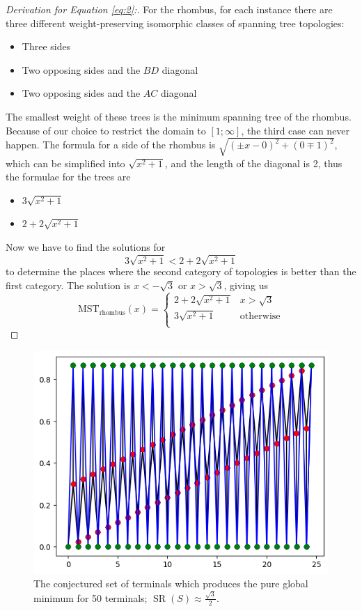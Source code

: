 \documentclass{mpaper}
\begin{document}
\begin{proof} [Derivation for Equation \ref{eq:2}:]
  For the rhombus, for each instance there are three different weight-preserving isomorphic classes of spanning tree topologies:
  \begin{itemize}
    \item Three sides
    \item Two opposing sides and the $BD$ diagonal
    \item Two opposing sides and the $AC$ diagonal
  \end{itemize}
  The smallest weight of these trees is the minimum spanning tree of the rhombus. Because of our choice to restrict the domain to $[1;\infty]$, the third case can never happen. The formula for a side of the rhombus is $\sqrt{(\pm x-0)^2+(0\mp 1)^2}$, which can be simplified into $\sqrt{x^2+1}$, and the length of the diagonal is 2, thus the formulae for the trees are
  \begin{itemize}
    \item $3\sqrt{x^2+1}$
    \item $2+2\sqrt{x^2+1}$
  \end{itemize}
  Now we have to find the solutions for $$3\sqrt{x^2+1} < 2+2\sqrt{x^2+1}$$  to determine the places where the second  category of topologies is better than the first category. The solution is $x<-\sqrt{3}$ or $x>\sqrt{3}$, giving us
\[
  \operatorname{MST_{rhombus}}(x)=  
\begin{cases} 
  2+2\sqrt{x^2+1} & x >\sqrt{3} \\
  3\sqrt{x^2+1} & \text{otherwise} \\
\end{cases}
\]
\end{proof}
\begin{figure}[h!]
  \begin{center}
  \includegraphics[scale=0.5]{plot14.png}
  \end{center}
  \caption{\label{fig:15} The conjectured set of terminals which produces the pure global minimum for 50 terminals; $\operatorname{SR}(S) \approx \frac{\sqrt{3}}{2}$.}
\end{figure}
\end{document}
